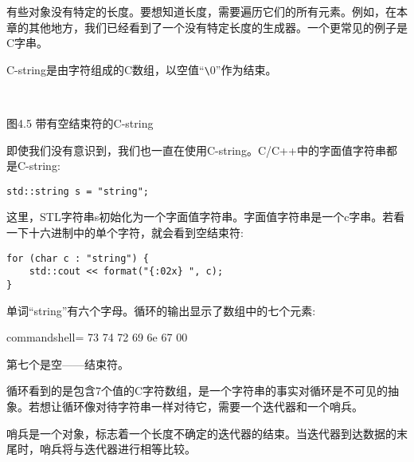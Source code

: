 
有些对象没有特定的长度。要想知道长度，需要遍历它们的所有元素。例如，在本章的其他地方，我们已经看到了一个没有特定长度的生成器。一个更常见的例子是C字串。

C-string是由字符组成的C数组，以空值“\verb|\|0”作为结束。

\hspace*{\fill} \\ %
\begin{center}

图4.5 带有空结束符的C-string
\end{center}

即使我们没有意识到，我们也一直在使用C-string。C/C++中的字面值字符串都是C-string:

\begin{lstlisting}[style=styleCXX]
std::string s = "string";
\end{lstlisting}

这里，STL字符串s初始化为一个字面值字符串。字面值字符串是一个c字串。若看一下十六进制中的单个字符，就会看到空结束符:

\begin{lstlisting}[style=styleCXX]
for (char c : "string") {
	std::cout << format("{:02x} ", c);
}
\end{lstlisting}

单词“string”有六个字母。循环的输出显示了数组中的七个元素:

\begin{tcblisting}{commandshell={}}
73 74 72 69 6e 67 00
\end{tcblisting}

第七个是空——结束符。

循环看到的是包含7个值的C字符数组，是一个字符串的事实对循环是不可见的抽象。若想让循环像对待字符串一样对待它，需要一个迭代器和一个哨兵。

哨兵是一个对象，标志着一个长度不确定的迭代器的结束。当迭代器到达数据的末尾时，哨兵将与迭代器进行相等比较。

